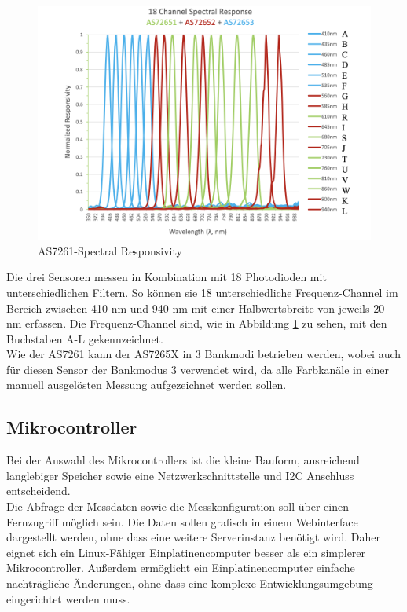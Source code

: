 \begin{figure}[H]
  \centering
 \includegraphics[width=0.9\linewidth]{img/AS7265X-Spectral_Responsivity.png}
 \caption{AS7261-Spectral Responsivity \cite{Datenblatt_AS7265X}}
  \label{fig:AS7261-Spectral_Responsivity}
\end{figure}

\noindent Die drei Sensoren messen in Kombination mit 18  Photodioden mit unterschiedlichen Filtern. So können sie 18 unterschiedliche Frequenz-Channel im Bereich zwischen 410 nm und 940 nm mit einer Halbwertsbreite von jeweils 20 nm erfassen.
Die Frequenz-Channel sind, wie in Abbildung \ref{fig:AS7261-Spectral_Responsivity} zu sehen, mit den Buchstaben A-L gekennzeichnet.\\
Wie der AS7261 kann der AS7265X in 3 Bankmodi betrieben werden, wobei auch für diesen Sensor der Bankmodus 3 verwendet wird, da alle Farbkanäle in einer manuell ausgelösten Messung aufgezeichnet werden sollen.
\newpage
\subsection{Mikrocontroller}\label{Mikrocontroller}
Bei der Auswahl des Mikrocontrollers ist die kleine Bauform, ausreichend langlebiger Speicher sowie eine Netzwerkschnittstelle und I2C Anschluss entscheidend.\\
Die Abfrage der Messdaten sowie die Messkonfiguration soll über einen Fernzugriff möglich sein. Die Daten sollen grafisch in einem Webinterface dargestellt werden, ohne dass eine weitere Serverinstanz benötigt wird. Daher eignet sich ein Linux-Fähiger Einplatinencomputer besser als ein simplerer Mikrocontroller.
Außerdem ermöglicht ein Einplatinencomputer einfache nachträgliche Änderungen, ohne dass eine komplexe Entwicklungsumgebung eingerichtet werden muss.\\

